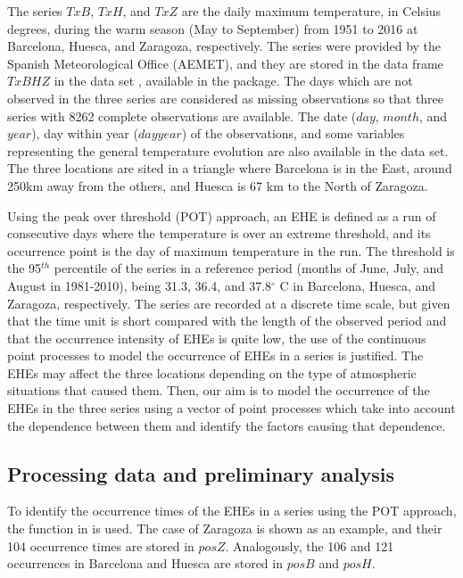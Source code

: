 The series $TxB$, $TxH$, and $TxZ$ are the  daily maximum temperature, in Celsius degrees,  during the  warm season (May to September)  from  1951 to 2016  at Barcelona, Huesca, and Zaragoza, respectively. The series were provided by the Spanish Meteorological Office (AEMET), and they are stored in the data frame $TxBHZ$ in the data set , available  in the package. The days which are not observed in the three series are considered as missing observations so that  three series with 8262 complete observations are available.  The date ($day$, $month$, and $year$), day within year ($dayyear$) of the observations, and some variables representing  the  general temperature  evolution  are  also  available in the data set. 
The  three locations are sited in a triangle where Barcelona is in the East, around 250km away from the others, and Huesca is 67 km  to the  North of Zaragoza. 


 Using the peak over threshold (POT) approach, an  EHE is defined as a run of consecutive days where the temperature is over an extreme threshold, and its occurrence point is the  day of maximum temperature in the run. The threshold is  the 95$^{th}$ percentile of the series in a reference period (months of June, July, and August  in 1981-2010), being	31.3, 36.4, and 37.8$^{\circ}$ C in Barcelona, Huesca, and Zaragoza, respectively. 	 The series are recorded at a discrete time scale, but given that the time unit is short compared with the length of the observed period and that the occurrence intensity  of EHEs is quite low, the use of the continuous  point processes to model  the occurrence of EHEs in a series is justified.  The EHEs may affect the three locations depending on  the type of  atmospheric situations  that caused them. Then, our aim is to model the occurrence of the EHEs in the three series  using a vector of point processes which take into account the dependence  between them and   identify the factors causing that dependence.

\subsection{Processing data and preliminary analysis}

To identify the occurrence times  of the EHEs in a series using the POT approach, the function  in  is used.  The case of Zaragoza is shown as an example, and their 104 occurrence  times  are stored in $posZ$.  Analogously, the  106 and 121 occurrences in  Barcelona and Huesca are stored in $posB$ and $posH$.

